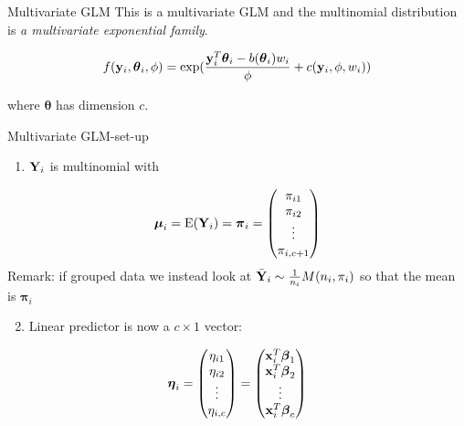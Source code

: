 \documentclass[
  ignorenonframetext,
]{beamer}
\providecommand{\tightlist}{%
  \setlength{\itemsep}{0pt}\setlength{\parskip}{0pt}}
\begin{document}
\begin{frame}
\begin{block}{Multivariate GLM}
\label{multivariate-glm}
This is a multivariate GLM and the multinomial distribution is \emph{a
multivariate exponential family}.

\[f({\bf y}_i,{\boldsymbol \theta}_i,\phi)=\exp(\frac{ {\bf y}_i^T{\boldsymbol \theta}_i-b({\boldsymbol \theta}_i)w_i}{\phi}+c({\bf y}_i,\phi,w_i))\]

where \({\boldsymbol \theta}\) has dimension \(c\).
\end{block}
\end{frame}

\begin{frame}
\begin{block}{Multivariate GLM-set-up}
\label{multivariate-glm-set-up}
\begin{enumerate}
\tightlist
\item
  \({\bf Y}_i\) is multinomial with
\end{enumerate}

\[{\boldsymbol \mu}_i=\text{E}({\bf Y}_i)=
{\boldsymbol \pi}_i=\begin{pmatrix} \pi_{i1}\\ \pi_{i2}\\ \vdots \\ \pi_{i,c+1}\end{pmatrix}\]
Remark: if grouped data we instead look at
\(\bar{\bf Y}_i\sim \frac{1}{n_i}M(n_i,\pi_i)\) so that the mean is
\({\boldsymbol \pi}_i\)
\end{block}
\end{frame}

\begin{frame}
\begin{enumerate}
\setcounter{enumi}{1}
\tightlist
\item
  Linear predictor is now a \(c \times 1\) vector:
\end{enumerate}

\[{\boldsymbol \eta}_i=\begin{pmatrix} \eta_{i1}\\ \eta_{i2}\\ \vdots \\ \eta_{i,c}\end{pmatrix}=
\begin{pmatrix} {\bf x}_i^T{\boldsymbol \beta}_{1}\\ {\bf x}_i^T{\boldsymbol \beta}_{2}\\ \vdots \\ {\bf x}_i^T{\boldsymbol \beta}_{c} \end{pmatrix}\]
\end{frame}
\end{document}
